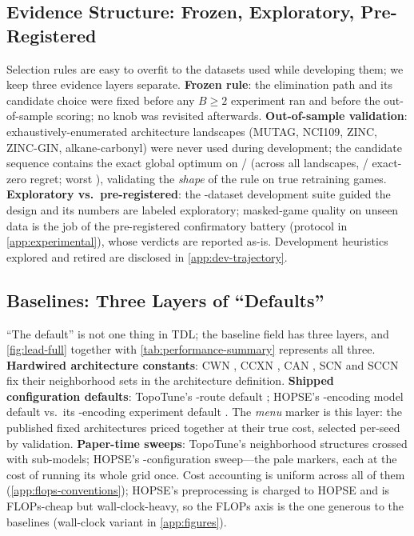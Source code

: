 \subsection{Evidence Structure: Frozen, Exploratory, Pre-Registered}
\label{app:selection-evidence}

Selection rules are easy to overfit to the datasets used while
developing them; we keep three evidence layers separate.
\textbf{Frozen rule}: the elimination path and its candidate choice
were fixed before
any $B \ge 2$ experiment ran and before the out-of-sample scoring; no
knob was revisited afterwards. \textbf{Out-of-sample validation}:
\unfrozen{\ResLadderOOSTotal} exhaustively-enumerated architecture
landscapes (MUTAG, NCI109, ZINC, ZINC-GIN, alkane-carbonyl) were never
used during development; the candidate sequence contains the exact
global optimum on \unfrozen{\ResLadderOOSContained}/\unfrozen{\ResLadderOOSTotal}
(across all \unfrozen{\ResLadderAllTotal} landscapes,
\unfrozen{\ResLadderAllContained}/\unfrozen{\ResLadderAllTotal}
exact-zero regret; worst \unfrozen{\ResLadderOOSWorstRegret}),
validating the \emph{shape} of the rule on true retraining games.
\textbf{Exploratory vs.\ pre-registered}: the
\unfrozen{\ResMarkerDatasets}-dataset development suite guided the
design and its numbers are labeled exploratory; masked-game quality on
unseen data is the job of the pre-registered confirmatory battery
(protocol in \cref{app:experimental}), whose verdicts are reported
as-is. Development heuristics explored and retired are disclosed in
\cref{app:dev-trajectory}.

\subsection{Baselines: Three Layers of ``Defaults''}
\label{app:selection-baselines}

``The default'' is not one thing in TDL; the baseline field has three
layers, and \cref{fig:lead-full} together with
\cref{tab:performance-summary} represents all three. \textbf{Hardwired architecture constants}: CWN
\citep{bodnar2021cwn}, CCXN \citep{hajij2020ccxn}, CAN
\citep{giusti2022can}, SCN and SCCN \citep{yang2022sccnn} fix their
neighborhood sets in the architecture definition. \textbf{Shipped
configuration defaults}: TopoTune's
\unfrozen{\ResTopoTuneRouteDefault}-route default
\citep{papillon2025topotune}; HOPSE's
\unfrozen{\ResHopseModelDefaultBlocks}-encoding model default vs.\ its
\unfrozen{\ResHopseExptDefaultBlocks}-encoding experiment default
\citep{hopse2025}. The \emph{menu} marker is this layer: the
\unfrozen{\ResMenuEntries} published fixed architectures priced
together at their true cost, selected per-seed by validation.
\textbf{Paper-time sweeps}: TopoTune's
\unfrozen{\ResTopoTuneSweepStructures} neighborhood structures crossed
with sub-models; HOPSE's
\unfrozen{\ResHopseSweepConfigs}-configuration sweep---the pale
markers, each at the cost of running its whole grid once. Cost
accounting is uniform across all of them
(\cref{app:flops-conventions}); HOPSE's preprocessing is charged to
HOPSE and is FLOPs-cheap but wall-clock-heavy, so the FLOPs axis is
the one generous to the baselines (wall-clock variant in
\cref{app:figures}).
